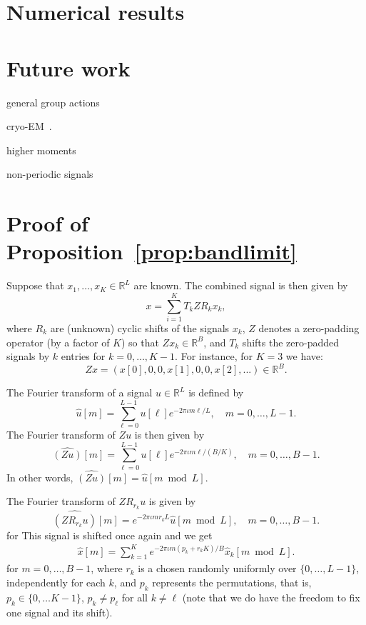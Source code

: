 \documentclass[english,12pt]{article}
\newcommand{\I}{\iota}
\newcommand{\R}{\mathbb{R}}
\numberwithin{equation}{section}
\numberwithin{thm}{section} %
\begin{document}
\section{Numerical results}


\section{Future work}
general group actions

cryo-EM~\cite{chen2018single}.

higher moments

non-periodic signals 

	
	




\appendix

\section{Proof of Proposition~\ref{prop:bandlimit}} \label{sec:proof_bandlimit}
Suppose that $x_1,\ldots,x_K\in\R^L$ are known.
The combined signal is then given by 
\begin{equation}
x = \sum_{i=1}^K T_kZR_kx_k,
\end{equation}
where $R_k$ are (unknown) cyclic shifts of the signals $x_k$, $Z$ denotes a zero-padding operator (by a factor of $K$) so that $Zx_k\in\mathbb{R}^B$, and $T_k$ shifts the zero-padded signals by $k$ entries for $k=0,\ldots, K-1$. 
For instance, for $K=3$ we have: 
\begin{equation}
Zx = (x[0],0,0,x[1],0,0,x[2],...)\in\mathbb{R}^B.
\end{equation}

The Fourier transform of a signal $u\in\mathbb{R}^{L}$ is defined by 
\begin{equation}
\hat{u}[m]=\sum_{\ell=0}^{L-1}u[\ell]e^{-2\pi\I m\ell /L}, \quad m=0,\ldots,L-1. 
\end{equation}
The Fourier transform of $Zu$ is then given by 
\begin{equation}
\widehat{(Zu)}[m] = \sum_{\ell=0}^{L-1}u[\ell]e^{-2\pi\I m\ell /(B/K)}, \quad m=0,\ldots,B-1.
\end{equation}
In other words, $\widehat{(Zu)}[m] = \hat{u}[m\bmod L]$.


The Fourier transform of $ZR_{r_k}u$ is  given by 
\begin{equation}
\widehat{(ZR_{r_k}u)}[m] = e^{-2\pi\I m r_k L} \hat{u}[m\bmod L], \quad m=0,\ldots,B-1.
\end{equation}
for 
This signal is shifted once again and we get
\begin{eqnarray} \label{eq:Fourier_structure}
\hat{x}[m] = \sum_{k=1}^K e^{-2\pi\I m( p_k+r_k K)/B} \hat{x}_k[m \bmod L]. 
\end{eqnarray}
for $m=0,\ldots,B-1$, 
where $r_k$ is a chosen randomly uniformly over $\{0,\ldots,L-1\}$, independently for each $k$, and $p_k$ represents the permutations, that is, $p_k\in\{0,\ldots K-1\}$, $p_k\neq p_\ell$ for all $k\neq \ell$ (note that we do have the freedom to fix one signal and its shift). 
\end{document}
